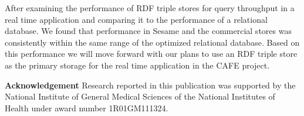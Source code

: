 \documentclass{llncs}
\begin{document}
After examining the performance of RDF triple stores for query throughput in a real time application and comparing it to the performance of a relational database.  We found that performance in Sesame and the commercial stores was consistently within the same range of the optimized relational database.  Based on this performance we will move forward with our plans to use an RDF triple store as the primary storage for the real time application in the CAFE project.

\medskip
\noindent
\textbf{Acknowledgement} Research reported in this publication was supported by the National Institute of General Medical Sciences of the National Institutes of Health under award number 1R01GM111324.



\end{document}
